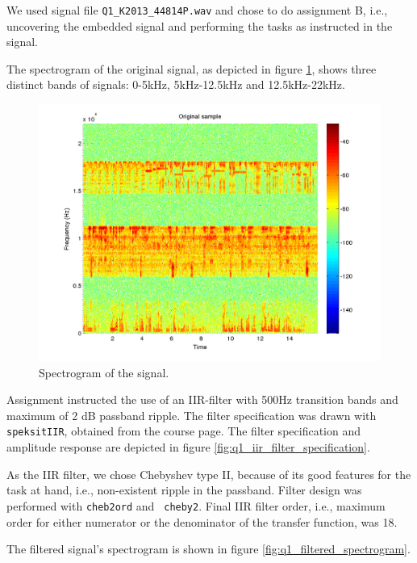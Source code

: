 We used signal file {\tt Q1\_K2013\_44814P.wav} and chose to do
assignment B, i.e., uncovering the embedded signal and performing the
tasks as instructed in the signal. 

The spectrogram of the original signal, as depicted in
figure \ref{fig:q1_spectrogram}, shows three distinct bands of signals:
0-5kHz, 5kHz-12.5kHz and 12.5kHz-22kHz.

\begin{figure}
  \begin{center}
    \hspace*{-1in}
    \includegraphics[width=180mm]{q1_spectrogram}
    \caption{Spectrogram of the signal. \label{fig:q1_spectrogram}}
  \end{center}  
\end{figure}

Assignment instructed the use of an IIR-filter with 500Hz transition
bands and maximum of 2 dB passband ripple.  The filter specification was
drawn with {\tt speksitIIR}, obtained from the course page.  The filter
specification and amplitude response are depicted in
figure \ref{fig:q1_iir_filter_specification}.

As the IIR filter, we chose Chebyshev type II, because of its good
features for the task at hand, i.e., non-existent ripple in the
passband.  Filter design was performed with {\tt cheb2ord} and {\tt
cheby2}.  Final IIR filter order, i.e., maximum order for either
numerator or the denominator of the transfer function, was 18.

The filtered signal's spectrogram is shown in figure
\ref{fig:q1_filtered_spectrogram}.

